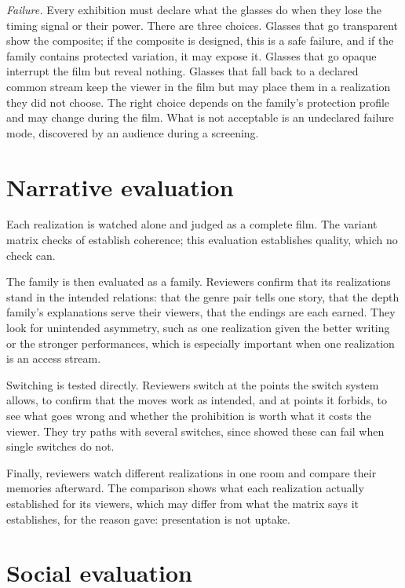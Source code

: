 \emph{Failure.} Every exhibition must declare what the glasses do when they lose the timing signal or their power. There are three choices. Glasses that go transparent show the composite; if the composite is designed, this is a safe failure, and if the family contains protected variation, it may expose it. Glasses that go opaque interrupt the film but reveal nothing. Glasses that fall back to a declared common stream keep the viewer in the film but may place them in a realization they did not choose. The right choice depends on the family's protection profile and may change during the film. What is not acceptable is an undeclared failure mode, discovered by an audience during a screening.

\section{Narrative evaluation}

Each realization is watched alone and judged as a complete film. The variant matrix checks of  establish coherence; this evaluation establishes quality, which no check can.

The family is then evaluated as a family. Reviewers confirm that its realizations stand in the intended relations: that the genre pair tells one story, that the depth family's explanations serve their viewers, that the endings are each earned. They look for unintended asymmetry, such as one realization given the better writing or the stronger performances, which is especially important when one realization is an access stream.

Switching is tested directly. Reviewers switch at the points the switch system allows, to confirm that the moves work as intended, and at points it forbids, to see what goes wrong and whether the prohibition is worth what it costs the viewer. They try paths with several switches, since  showed these can fail when single switches do not.

Finally, reviewers watch different realizations in one room and compare their memories afterward. The comparison shows what each realization actually established for its viewers, which may differ from what the matrix says it establishes, for the reason  gave: presentation is not uptake.

\section{Social evaluation}


